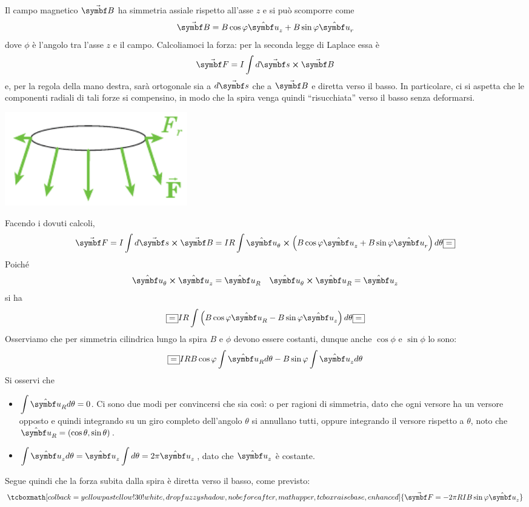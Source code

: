 Il campo magnetico $\vba{B}$ ha simmetria assiale rispetto all'asse $z$ e si può scomporre come
\begin{equation*}
	\vba{B}=B\cos\phi\vbh{u}_z+B\sin\phi\vbh{u}_r
\end{equation*}
dove $\phi$ è l'angolo tra l'asse $z$ e il campo. Calcoliamoci la forza: per la seconda legge di Laplace essa è
\begin{equation*}
	\vba{F}=I\int d\vba{s}\cross\vba{B}
\end{equation*}
e, per la regola della mano destra, sarà ortogonale sia a $d\vba{s}$ che a $\vba{B}$ e diretta verso il basso. In particolare, ci si aspetta che le componenti radiali di tali forze si compensino, in modo che la spira venga quindi ``risucchiata'' verso il basso senza deformarsi.
\begin{center}
	\includegraphics[width=0.35\textwidth]{images/chp8/chp8magnetecilindrico2.pdf}
\end{center}
Facendo i dovuti calcoli,
\begin{equation*}
	\vba{F}=I\int d\vba{s}\cross\vba{B}=IR\int\vbh{u}_{\theta}\cross\left(B\cos\phi\vbh{u}_z+B\sin\phi\vbh{u}_r\right)d\theta\squarequal
\end{equation*}
Poiché
\begin{align*}
	\vbh{u}_{\theta}\cross\vbh{u}_{z}=\vbh{u}_R&&
	\vbh{u}_{\theta}\cross\vbh{u}_{R}=\vbh{u}_z
\end{align*}
si ha
\begin{equation*}
	\squarequal IR\int \left(B\cos\phi\vbh{u}_R-B\sin\phi\vbh{u}_z\right)d\theta\squarequal
\end{equation*}
Osserviamo che per simmetria cilindrica lungo la spira $B$ e $\phi$ devono essere costanti, dunque anche $\cos\phi$ e $\sin\phi$ lo sono:
\begin{equation*}
	\squarequal IRB\cos\phi\int \vbh{u}_Rd\theta-B\sin\phi\int\vbh{u}_zd\theta
\end{equation*}
Si osservi che
\begin{itemize}
	\item $\displaystyle\int\vbh{u}_Rd\theta=0$. Ci sono due modi per convincersi che sia così: o per ragioni di simmetria, dato che ogni versore ha un versore opposto e quindi integrando su un giro completo dell'angolo $\theta$ si annullano tutti, oppure integrando il versore rispetto a $\theta$, noto che $\vbh{u}_R=\left(\cos\theta,\sin\theta\right)$. 
	\item $\displaystyle\int\vbh{u}_zd\theta=\vbh{u}_z\int d\theta=2\pi\vbh{u}_z$, dato che $\vbh{u}_z$ è costante.
\end{itemize}
Segue quindi che la forza subita dalla spira è diretta verso il basso, come previsto:
\begin{equation}
	\tcboxmath[colback=yellowpastellow!30!white,drop fuzzy shadow, nobeforeafter, math upper, tcbox raise base, enhanced]{\vba{F}=-2\pi R I B\sin\phi\vbh{u}_z}
\end{equation}
